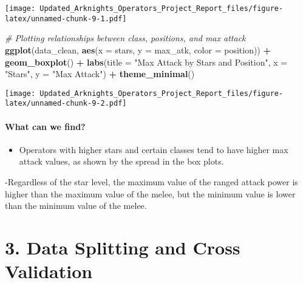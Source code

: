 \documentclass[
]{article}
\newenvironment{Shaded}{\begin{snugshade}}{\end{snugshade}}
\newcommand{\AttributeTok}[1]{\textcolor[rgb]{0.13,0.29,0.53}{#1}}
\newcommand{\CommentTok}[1]{\textcolor[rgb]{0.56,0.35,0.01}{\textit{#1}}}
\newcommand{\FunctionTok}[1]{\textcolor[rgb]{0.13,0.29,0.53}{\textbf{#1}}}
\newcommand{\NormalTok}[1]{#1}
\newcommand{\SpecialCharTok}[1]{\textcolor[rgb]{0.81,0.36,0.00}{\textbf{#1}}}
\newcommand{\StringTok}[1]{\textcolor[rgb]{0.31,0.60,0.02}{#1}}
\providecommand{\tightlist}{%
  \setlength{\itemsep}{0pt}\setlength{\parskip}{0pt}}
\begin{document}
\texttt{[image: Updated\_Arknights\_Operators\_Project\_Report\_files/figure-latex/unnamed-chunk-9-1.pdf]}

\begin{Shaded}
\begin{Highlighting}[]
\CommentTok{\# Plotting relationships between class, positions, and max attack}
\FunctionTok{ggplot}\NormalTok{(data\_clean, }\FunctionTok{aes}\NormalTok{(}\AttributeTok{x =}\NormalTok{ stars, }\AttributeTok{y =}\NormalTok{ max\_atk, }\AttributeTok{color =}\NormalTok{ position)) }\SpecialCharTok{+}
  \FunctionTok{geom\_boxplot}\NormalTok{() }\SpecialCharTok{+}
  \FunctionTok{labs}\NormalTok{(}\AttributeTok{title =} \StringTok{"Max Attack by Stars and Position"}\NormalTok{, }\AttributeTok{x =} \StringTok{"Stars"}\NormalTok{, }\AttributeTok{y =} \StringTok{"Max Attack"}\NormalTok{) }\SpecialCharTok{+}
  \FunctionTok{theme\_minimal}\NormalTok{()}
\end{Highlighting}
\end{Shaded}

\texttt{[image: Updated\_Arknights\_Operators\_Project\_Report\_files/figure-latex/unnamed-chunk-9-2.pdf]}

\paragraph{What can we find?}\label{what-can-we-find-1}

\begin{itemize}
\tightlist
\item
  Operators with higher stars and certain classes tend to have higher
  max attack values, as shown by the spread in the box plots.
\end{itemize}

-Regardless of the star level, the maximum value of the ranged attack
power is higher than the maximum value of the melee, but the minimum
value is lower than the minimum value of the melee.

\section{3. Data Splitting and Cross
Validation}\label{data-splitting-and-cross-validation}
\end{document}
